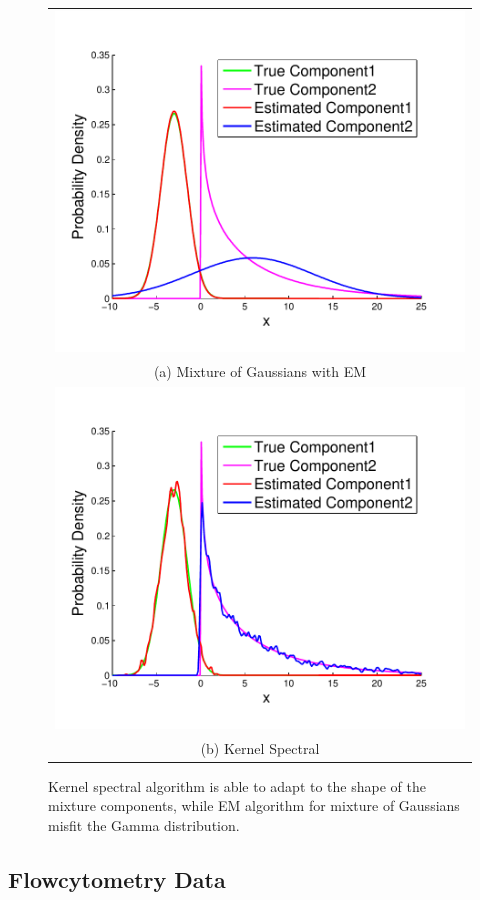 \documentclass{article}
\begin{document}
\begin{figure}[t]
  \centering
  \renewcommand{\tabcolsep}{5pt}
  \begin{tabular}{c}
  \includegraphics[width=0.70\columnwidth]{../experiment/visualization/em_visual_k_2_view_1-crop} \\
  (a) Mixture of Gaussians with EM\\
  \includegraphics[width=0.70\columnwidth]{../experiment/visualization/visual_k_2_view_1-crop} \\ 
  (b) Kernel Spectral
  \end{tabular}
  \vspace{-3mm}
  \caption{Kernel spectral algorithm is able to adapt to the shape of the mixture components, while EM algorithm for mixture of Gaussians misfit the Gamma distribution.}\label{fig:shape}
  \vspace{-3mm}
\end{figure}

\subsection{Flowcytometry Data} 

\end{document}
